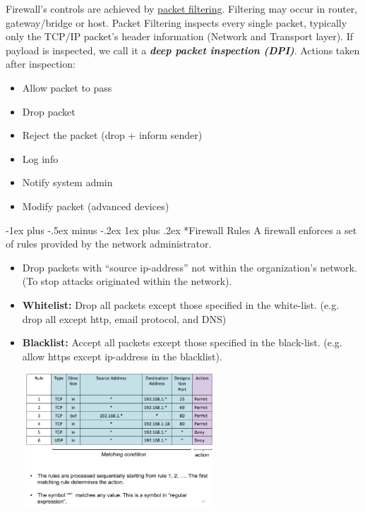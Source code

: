 \documentclass[10pt,landscape]{article}
\makeatletter
\renewcommand{\subsubsection}{\@startsection{subsubsection}{3}{0mm}%
                                {-1ex plus -.5ex minus -.2ex}%
                                {1ex plus .2ex}%
                                {\normalfont\small\bfseries}}
\makeatother
\begin{document}
\begin{multicols*}{3}
Firewall's controls are achieved by \underline{packet filtering}. Filtering may occur in router, gateway/bridge or host.
Packet Filtering inspects every single packet, typically only the TCP/IP packet's header information (Network and Transport layer).
If payload is inspected, we call it a \textbf{\textit{deep packet inspection (DPI)}}. Actions taken after inspection:
\begin{multicols*}{2}
    \noindent
    \begin{itemize}[noitemsep,wide=0pt, leftmargin=\dimexpr{} + 2\relax]
        \item Allow packet to pass
        \item Drop packet
        \item Reject the packet (drop + inform sender)
        \item Log info
        \item Notify system admin
        \item Modify packet (advanced devices)
    \end{itemize}
\end{multicols*}

\subsubsection*{Firewall Rules}
A firewall enforces a set of rules provided by the network administrator.
\begin{itemize}[noitemsep,wide=0pt, leftmargin=\dimexpr{} + 2\relax]
    \item Drop packets with “source ip-address” not within the
    organization’s network. (To stop attacks originated within
    the network).
    \item \textbf{Whitelist:} Drop all packets except those specified in the white-list. (e.g. drop all
    except http, email protocol, and DNS)
    \item \textbf{Blacklist:} Accept all packets except those specified in the black-list. (e.g. allow
    https except ip-address in the blacklist).
\end{itemize}

\includegraphics[width=8.5cm, height=5cm]{images/firewallrules.png}


\end{multicols*}
\end{document}
